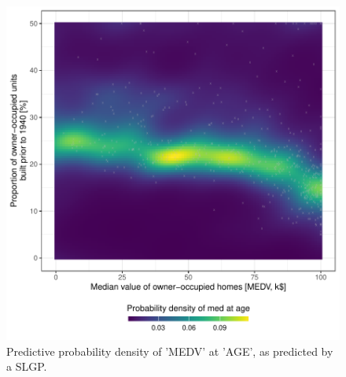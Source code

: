 \documentclass[
]{article}
\begin{document}
\begin{figure}[H]

{\centering \includegraphics{IntroductionSLGP_files/figure-latex/SLGPplotting1-1} 

}

\caption{Predictive probability density of 'MEDV' at 'AGE', as predicted by a SLGP.}\label{fig:SLGPplotting1}
\end{figure}
\end{document}
